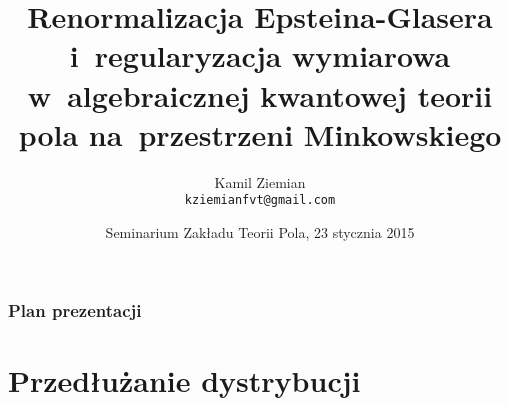 \documentclass[10pt,t]{beamer}
\title{Renormalizacja Epsteina-Glasera i~regularyzacja
  wymiarowa w~algebraicznej kwantowej teorii pola na~przestrzeni
  Minkowskiego}
\author{Kamil Ziemian \\
  \texttt{kziemianfvt@gmail.com}}
\institute{Uniwersytet Jagielloński w~Krakowie}
\date[23 I 2015]{Seminarium Zakładu Teorii Pola, 23 stycznia 2015}
\begin{document}





\RaggedRight






\maketitle





\begin{frame}
  \frametitle{Plan prezentacji}


  \tableofcontents %

\end{frame}










\section{Przedłużanie dystrybucji}
\end{document}
